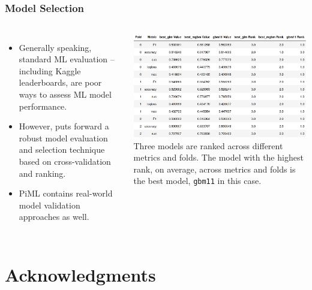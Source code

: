 \documentclass[11pt,aspectratio=169,hyperref={colorlinks}]{beamer}
\begin{document}
	\subsection*{}
	
	\begin{frame}
	
		\frametitle{Model Selection}		
	
	\begin{columns}
		
		\begin{itemize}
			\item Generally speaking, standard ML evaluation -- including Kaggle leaderboards, are poor ways to assess ML model performance.
			\item However, \cite{caruana2004kdd} puts forward a robust model evaluation and selection technique based on cross-validation and ranking. 
			\item PiML contains real-world model validation approaches as well.
		\end{itemize}
	
		\centering
		\includegraphics[height=130pt]{../img/cv_ranking.png}\vspace{5pt}
		\scriptsize{Three models are ranked across different metrics and folds. The model with the highest rank, on average, across metrics and folds is the best model, \texttt{gbm11} in this case.}
		
	\end{columns}
	
\end{frame}	

\section{Acknowledgments}

\subsection*{}
\end{document}
